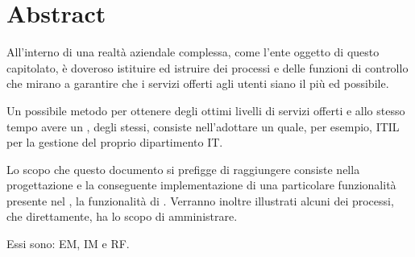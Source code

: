 %
%
\chapter{Abstract}
\label{abs}
All'interno di una realtà aziendale complessa, come l'ente oggetto di questo capitolato, è doveroso istituire ed istruire dei processi e delle funzioni di controllo che mirano a garantire che i servizi offerti agli utenti siano il più  ed  possibile.

Un possibile metodo per ottenere degli ottimi livelli di servizi offerti e allo stesso tempo avere un , degli stessi, consiste nell'adottare un  quale, per esempio, \ac{ITIL} per la gestione del proprio dipartimento \acs{IT}.

Lo scopo che questo documento si prefigge di raggiungere consiste nella progettazione e la conseguente implementazione di una particolare funzionalità presente nel , la funzionalità di . Verranno inoltre illustrati alcuni dei processi, che direttamente, ha lo scopo di amministrare.

Essi sono: \acf{EM}, \acf{IM} e \acf{RF}.





